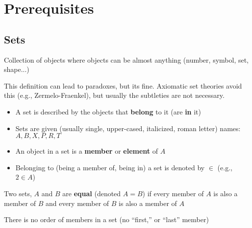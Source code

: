 \setcounter{chapter}{-1}
\chapter{Prerequisites}
\section{Sets}
\begin{definition*}[Set]\label{def:set}
    Collection of objects where objects can be almost anything (number, symbol, set, shape...)
\end{definition*}
\begin{note}
    This definition can lead to paradoxes, but its fine. Axiomatic set theories avoid this (e.g., Zermelo-Fraenkel), but usually the subtleties are not necessary.
\end{note}
\begin{itemize}
    \item A set is described by the objects that \textbf{belong} to it (are \textbf{in} it)
    \item Sets are given (usually single, upper-cased, italicized, roman letter) names: $A, B, X, P, R, T$
    \item An object in a set is a \textbf{member} or \textbf{element} of $A$
    \item Belonging to (being a member of, being in) a set is denoted by $\in$ (e.g., $2 \in A$)
\end{itemize}

\begin{definition}[Equal]\label{def:equal}
    Two sets, $A$ and $B$ are \textbf{equal} (denoted $A = B$) if every member of $A$ is also a member of $B$ and every member of $B$ is also a member of $A$
    \begin{note}
        There is no order of members in a set (no ``first,'' or ``last'' member)
    \end{note}
\end{definition}
